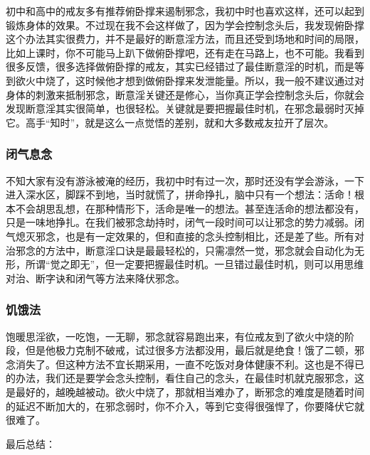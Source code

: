 \documentclass{ctexart}
\begin{document}
初中和高中的戒友多有推荐俯卧撑来遏制邪念，我初中时也喜欢这样，还可以起到锻炼身体的效果。不过现在我不会这样做了，因为学会控制念头后，我发现俯卧撑这个办法其实很费力，并不是最好的断意淫方法，而且还受到场地和时间的局限，比如上课时，你不可能马上趴下做俯卧撑吧，还有走在马路上，也不可能。我看到很多反馈，很多选择做俯卧撑的戒友，其实已经错过了最佳断意淫的时机，而是等到欲火中烧了，这时候他才想到做俯卧撑来发泄能量。所以，我一般不建议通过对身体的刺激来抵制邪念，断意淫关键还是修心，当你真正学会控制念头后，你就会发现断意淫其实很简单，也很轻松。关键就是要把握最佳时机，在邪念最弱时灭掉它。高手“知时”，就是这么一点觉悟的差别，就和大多数戒友拉开了层次。

\subsubsection{闭气息念}

不知大家有没有游泳被淹的经历，我初中时有过一次，那时还没有学会游泳，一下进入深水区，脚踩不到地，当时就慌了，拼命挣扎，脑中只有一个想法：活命！根本不会胡思乱想，在那种情形下，活命是唯一的想法。甚至连活命的想法都没有，只是一味地挣扎。在我们被邪念劫持时，闭气一段时间可以让邪念的势力减弱。闭气熄灭邪念，也是有一定效果的，但和直接的念头控制相比，还是差了些。所有对治邪念的方法中，断意淫口诀是最最轻松的，只需凛然一觉，邪念就会自动化为无形，所谓“觉之即无”，但一定要把握最佳时机。一旦错过最佳时机，则可以用思维对治、断字诀和闭气等方法来降伏邪念。

\subsubsection{饥饿法}

饱暖思淫欲，一吃饱，一无聊，邪念就容易跑出来，有位戒友到了欲火中烧的阶段，但是他极力克制不破戒，试过很多方法都没用，最后就是绝食！饿了二顿，邪念消失了。但这种方法不宜长期采用，一直不吃饭对身体健康不利。这也是不得已的办法，我们还是要学会念头控制，看住自己的念头，在最佳时机就克服邪念，这是最好的，越晚越被动。欲火中烧了，那就相当难办了，断邪念的难度是随着时间的延迟不断加大的，在邪念弱时，你不介入，等到它变得很强悍了，你要降伏它就很难了。


最后总结：
\end{document}
